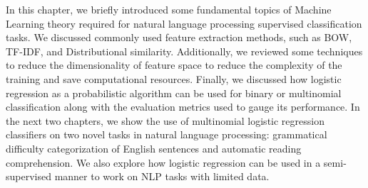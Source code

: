 In this chapter, we briefly introduced some fundamental topics of Machine Learning theory required for natural language processing supervised classification tasks. We discussed commonly used feature extraction methods, such as BOW, TF-IDF, and Distributional similarity. Additionally, we reviewed some techniques to reduce the dimensionality of feature space to reduce the complexity of the training and save computational resources. Finally, we discussed how logistic regression as a probabilistic algorithm can be used for binary or multinomial classification along with the evaluation metrics used to gauge its performance. In the next two chapters, we show the use of multinomial logistic regression classifiers on two novel tasks in natural language processing: grammatical difficulty categorization of English sentences and automatic reading comprehension. We also explore how logistic regression can be used in a semi-supervised manner to work on NLP tasks with limited data. 